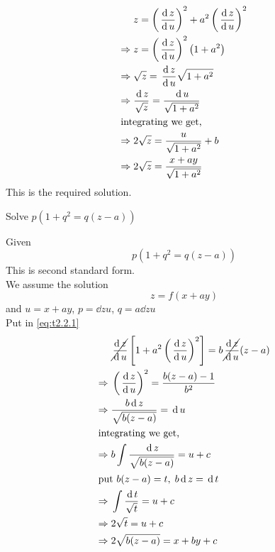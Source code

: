 \documentclass[../main-sheet.tex]{subfiles}
\begin{document}
\begin{enumerate}[label=\underline{Type - \Roman*}:]
\begin{soln}
            \begin{align*}
                &z=\left(\dd{z}{u}\right)^2+a^2\left(\dd{z}{u}\right)^2\\
                \Rightarrow\;&z=\left(\dd{z}{u}\right)^2\left(1+a^2\right)\\
                \Rightarrow\;&\sqrt{z}=\dd{z}{u}\sqrt{1+a^2}\\%
                \Rightarrow\;&\frac{\dz}{\sqrt{z}}=\frac{\D u}{\sqrt{1+a^2}}\\
                \intertext{integrating we get,}
                \Rightarrow\;&2\sqrt{z}=\frac{u}{\sqrt{1+a^2}}+b\\
                \Rightarrow\;&2\sqrt{z}=\frac{x+ay}{\sqrt{1+a^2}}
            \end{align*}
            This is the required solution.
        \end{soln}
        \begin{prob}
            Solve \(p(1+q^2=q(z-a))\)
        \end{prob}
        \begin{soln}
            Given
            \begin{equation}
                p(1+q^2=q(z-a)) \label{eq:t2.2.1}
            \end{equation}
            This is second standard form.\\
            We assume the solution
            \[z=f(x+ay)\]
            and \(u=x+ay\), \(p=\displaystyle \dd{z}{u}\), \(q=\displaystyle a\dd{z}{u}\)\\
            Put in \eqref{eq:t2.2.1}
            \begin{align*}
                &\cancel{\,\frac{\mathrm{d}\,z}{\mathrm{d}\, u}}\left[1+a^2\left(\,\frac{\mathrm{d}\,z}{\mathrm{d}\, u}\right)^2\right]=b\cancel{\,\frac{\mathrm{d}\,z}{\mathrm{d}\, u}}(z-a)\\
                \Rightarrow\;&\left(\,\frac{\mathrm{d}\,z}{\mathrm{d}\, u}\right)^2=\frac{b(z-a)-1}{b^2}\\
                \Rightarrow\;&\frac{b\,\mathrm{d}\, z}{\sqrt{b(z-a)}}=\,\mathrm{d}\, u\\
                \intertext{integrating we get,}
                \Rightarrow\;&b\int\frac{\,\mathrm{d}\, z}{\sqrt{b(z-a)}}=u+c\\
                \intertext{put \(b(z-a)=t,\;b\,\mathrm{d}\, z=\,\mathrm{d}\,t\)}
                \Rightarrow\;&\int\frac{\,\mathrm{d}\, t}{\sqrt{t}}=u+c\\
                \Rightarrow\;&2\sqrt{t}=u+c\\
                \Rightarrow\;&2\sqrt{b(z-a)}=x+by+c
            \end{align*}

\end{soln}
\end{enumerate}
\end{document}
